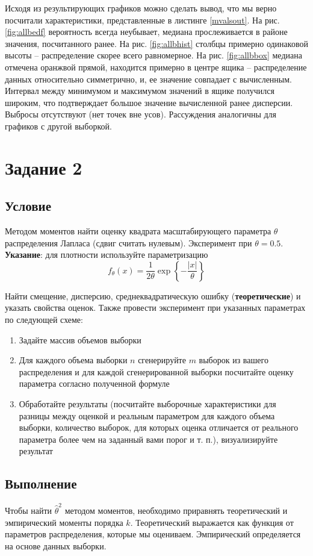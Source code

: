 \documentclass[a4paper, 12pt]{article}
\begin{document}
    \newpage
    Исходя из результирующих графиков можно сделать вывод, что мы верно посчитали характеристики,
    представленные в листинге \ref{mvalsout}.
    На рис. \ref{fig:allbedf} вероятность всегда неубывает, медиана прослеживается
    в районе значения, посчитанного ранее. На рис. \ref{fig:allbhist} столбцы примерно одинаковой высоты --
    распределение скорее всего равномерное. На рис. \ref{fig:allbbox} медиана отмечена
    оранжвой прямой, находится примерно в центре ящика -- распределение данных относительно
    симметрично, и, ее значение совпадает с вычисленным. Интервал между минимумом и максимумом значений в ящике получился
    широким, что подтверждает большое значение вычисленной ранее дисперсии. Выбросы отсутствуют (нет точек вне усов).
    Рассуждения аналогичны для графиков с другой выборкой.


    \section{Задание 2}
    \subsection{Условие}
    Методом моментов найти оценку квадрата масштабирующего параметра $\theta$ распределения Лапласа
    (сдвиг считать нулевым). Эксперимент при $\theta=0.5$. \textbf{Указание}: для плотности используйте
    параметризацию $$f_{\theta}(x)=\dfrac{1}{2\theta}\exp{\left\{-\dfrac{|x|}{\theta}\right\}}$$


    Найти смещение, дисперсию, среднеквадратическую ошибку (\textbf{теоретические}) и указать свойства оценок.
    Также провести эксперимент при указанных параметрах по следующей схеме:
    \begin{enumerate}
        \item Задайте массив объемов выборки
        \item Для каждого объема выборки $n$ сгенерируйте $m$ выборок из вашего распределения и для каждой
        сгенерированной выборки посчитайте оценку параметра согласно полученной формуле
        \item Обработайте результаты (посчитайте выборочные характеристики для разницы между оценкой и реальным
        параметром для каждого объема выборки, количество выборок, для которых оценка отличается от реального
        параметра более чем на заданный вами порог и т. п.), визуализируйте результат
    \end{enumerate}


    \subsection{Выполнение}
    Чтобы найти $\hat{\theta}^2$ методом моментов, необходимо приравнять теоретический и эмпирический
    моменты порядка $k$. Теоретический выражается как функция от параметров распределения, которые мы
    оцениваем. Эмпирический определяется на основе данных выборки.
\end{document}

